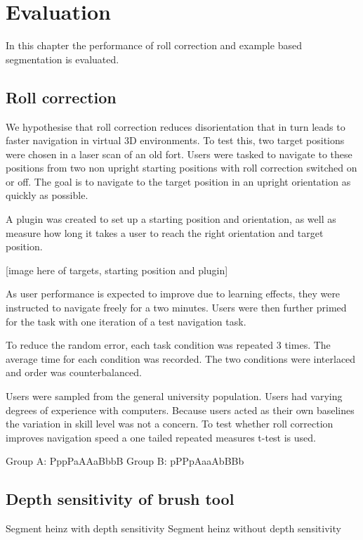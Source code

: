 \chapter{Evaluation} \label{ch:eval}

In this chapter the performance of roll correction and example based segmentation is evaluated.

\section{Roll correction}

We hypothesise that roll correction reduces disorientation that in turn leads to faster navigation in virtual 3D environments. To test this, two target positions were chosen in a laser scan of an old fort. Users were tasked to navigate to these positions from two non upright starting positions with roll correction switched on or off. The goal is to navigate to the target position in an upright orientation as quickly as possible.

A plugin was created to set up a starting position and orientation, as well as measure how long it takes a user to reach the right orientation and target position.

[image here of targets, starting position and plugin]

As user performance is expected to improve due to learning effects, they were instructed to navigate freely for a two minutes. Users were then further primed for the task with one iteration of a test navigation task.

To reduce the random error, each task condition was repeated 3 times. The average time for each condition was recorded. The two conditions were interlaced and order was counterbalanced.

Users were sampled from the general university population. Users had varying degrees of experience with computers. Because users acted as their own baselines the variation in skill level was not a concern. To test whether roll correction improves navigation speed a one tailed repeated measures t-test is used.

Group A: PppPaAAaBbbB
Group B: pPPpAaaAbBBb

\section{Depth sensitivity of brush tool}

Segment heinz with depth sensitivity
Segment heinz without depth sensitivity

